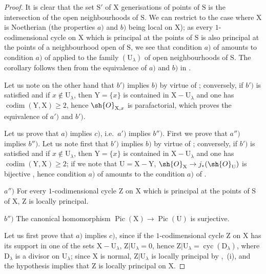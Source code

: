 \begin{proof}
It is clear that the set $\mathrm{S}'$ of $\mathrm{X}$ generisations of points of $\mathrm{S}$ is the intersection of the open neighbourhoods of $\mathrm{S}$.
We can restrict to the case where $\mathrm{X}$ is Noetherian (the properties $a)$ and $b)$ being local on $\mathrm{X}$); as every $1$-codimensional cycle on $\mathrm{X}$ which is principal at the points of $\mathrm{S}$ is also principal at the points of a neighbourhood open of $\mathrm{S}$, we see that condition $a)$ of  amounts to condition $a)$ of  applied to the family $(\mathrm{U}_\lambda)$ of open neighbourhoods of $\mathrm{S}$.
The corollary follows then from the equivalence of $a)$ and $b)$ in .

Let us note on the other hand that $b')$ implies $b)$ by virtue of ; conversely, if $b')$ is satisfied and if $x\notin\mathrm{U}_\lambda$, then $\mathrm{Y}=\{x\}$ is contained in $\mathrm{X}-\mathrm{U}_\lambda$ and one has $\operatorname{codim}(\mathrm{Y},\mathrm{X})\geq 2$, hence $\sh{O}_{\mathrm{X},x}$ is parafactorial, which proves the equivalence of $a')$ and $b')$.

Let us prove that $a)$ implies $c)$, i.e.\ $a')$ implies $b'')$.
First we prove that $a'')$ implies $b'')$.
Let us note first that $b')$ implies $b)$ by virtue of ; conversely, if $b')$ is satisfied and if $x\notin\mathrm{U}_\lambda$, then $\mathrm{Y}=\{x\}$ is contained in $\mathrm{X}-\mathrm{U}_\lambda$ and one has $\operatorname{codim}(\mathrm{Y},\mathrm{X})\geq 2$; if we note that $\mathrm{U}=\mathrm{X}-\mathrm{Y}$, $\sh{O}_{\mathrm{X}}\to j_*(\sh{O}_{\mathrm{U}})$ is bijective , hence condition $a)$ of  amounts to the condition $a)$ of .

$a'')$ For every $1$-codimensional cycle $\mathrm{Z}$ on $\mathrm{X}$ which is principal at the points of $\mathrm{S}$ of $\mathrm{X}$, $\mathrm{Z}$ is locally principal.

$b'')$ The canonical homomorphism $\operatorname{Pic}(\mathrm{X})\to\operatorname{Pic}(\mathrm{U})$ is surjective.

Let us first prove that $a)$ implies $c)$, since if the $1$-codimensional cycle $\mathrm{Z}$ on $\mathrm{X}$ has its support in one of the sets $\mathrm{X}-\mathrm{U}_\lambda$, $\mathrm{Z}|\mathrm{U}_\lambda=0$, hence $\mathrm{Z}|\mathrm{U}_\lambda=\operatorname{cyc}(\mathrm{D}_\lambda)$, where $\mathrm{D}_\lambda$ is a divisor on $\mathrm{U}_\lambda$; since $\mathrm{X}$ is normal, $\mathrm{Z}|\mathrm{U}_\lambda$ is locally principal by ,~(i), and the hypothesis implies that $\mathrm{Z}$ is locally principal on $\mathrm{X}$.


\end{proof}
